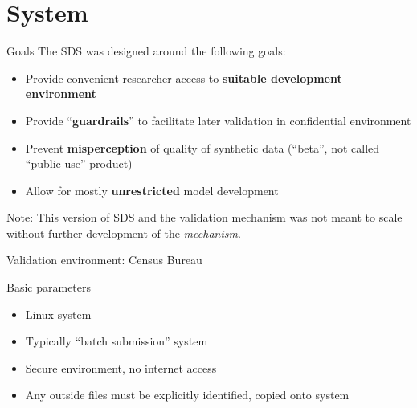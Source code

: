 

\section{System}

\begin{frame}{Goals}
The \ac{SDS} was designed around the following goals:
    \begin{itemize}
        \item Provide convenient researcher access to \textbf{suitable development environment}
        \item Provide ``\textbf{guardrails}'' to facilitate later validation in confidential environment
        \item Prevent \textbf{misperception} of quality of synthetic data (``beta'', not called ``public-use'' product)
        \item Allow for mostly \textbf{unrestricted} model development
    \end{itemize}
\tiny Note: This version of SDS and the validation mechanism was not meant to scale without further development of the \textit{mechanism}.
\end{frame}

\begin{frame}{Validation environment: Census Bureau}
\begin{block}{Basic parameters}
    \begin{itemize}
        \item Linux system
        \item Typically ``batch submission'' system 
        \item Secure environment, no internet access
        \item Any outside files must be explicitly identified, copied onto system
    \end{itemize}
\end{block}
\end{frame}

